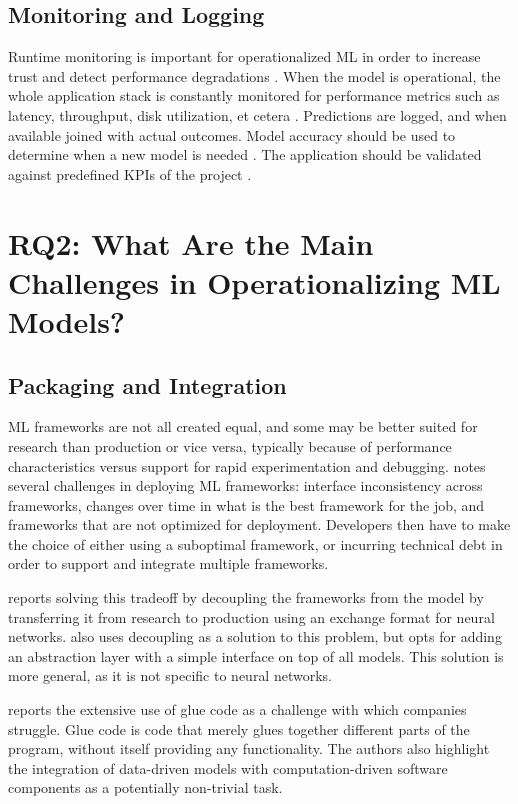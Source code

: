 \subsection{Monitoring and Logging}
Runtime monitoring is important for operationalized ML in order to increase trust and detect performance degradations \cite{Rausch2019, Li2017}.
When the model is operational, the whole application stack is constantly monitored for performance metrics such as latency, throughput, disk utilization, et cetera \cite{Ruf2021, Peticolas2019}.
Predictions are logged, and when available joined with actual outcomes\cite{Li2017}.
Model accuracy should be used to determine when a new model is needed \cite{Peticolas2019}.
The application should be validated against predefined KPIs of the project \cite{Ruf2021}.

\section{RQ2: What Are the Main Challenges in Operationalizing ML Models?}
\label{ch:research_results:rq2_challenges}
\subsection{Packaging and Integration}
ML frameworks are not all created equal, and some may be better suited for research than production or vice versa, typically because of performance characteristics versus support for rapid experimentation and debugging.
\cite{Crankshaw2017} notes several challenges in deploying ML frameworks: interface inconsistency across frameworks, changes over time in what is the best framework for the job, and frameworks that are not optimized for deployment.
Developers then have to make the choice of either using a suboptimal framework, or incurring technical debt in order to support and integrate multiple frameworks.

\cite{Hazelwood2018} reports solving this tradeoff by decoupling the frameworks from the model by transferring it from research to production using an exchange format for neural networks.
\cite{Crankshaw2017} also uses decoupling as a solution to this problem, but opts for adding an abstraction layer with a simple interface on top of all models.
This solution is more general, as it is not specific to neural networks.

\cite{Bosch2021} reports the extensive use of glue code as a challenge with which companies struggle.
Glue code is code that merely glues together different parts of the program, without itself providing any functionality.
The authors also highlight the integration of data-driven models with computation-driven software components as a potentially non-trivial task.

